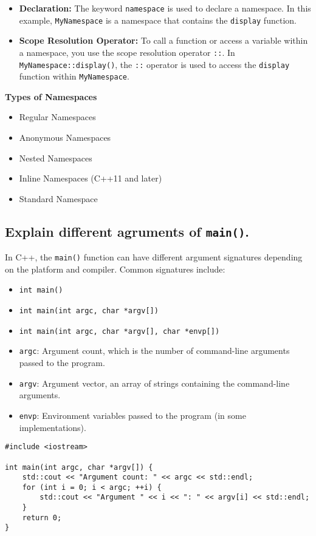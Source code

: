 \begin{itemize}
    \item \textbf{Declaration:} The keyword \texttt{namespace} is used to declare a namespace. In this example, \texttt{MyNamespace} is a namespace that contains the \texttt{display} function.
    \item \textbf{Scope Resolution Operator:} To call a function or access a variable within a namespace, you use the scope resolution operator \texttt{::}. In \texttt{MyNamespace::display()}, the \texttt{::} operator is used to access the \texttt{display} function within \texttt{MyNamespace}.
\end{itemize}

\textbf{Types of Namespaces}
\begin{itemize}
    \item Regular Namespaces
    \item Anonymous Namespaces
    \item Nested Namespaces
    \item Inline Namespaces (C++11 and later)
    \item Standard Namespace
\end{itemize}

\subsection{Explain different agruments of \texttt{main()}.}
In C++, the \texttt{main()} function can have different argument signatures depending on the platform and compiler. Common signatures include:
\begin{itemize}
    \item \texttt{int main()}
    \item \texttt{int main(int argc, char *argv[])}
    \item \texttt{int main(int argc, char *argv[], char *envp[])}
\end{itemize}
\begin{itemize}
    \item \texttt{argc}: Argument count, which is the number of command-line arguments passed to the program.
    \item \texttt{argv}: Argument vector, an array of strings containing the command-line arguments.
    \item \texttt{envp}: Environment variables passed to the program (in some implementations).
\end{itemize}
\begin{tcolorbox}[title=\texttt{main()} Function]
\begin{verbatim}
#include <iostream>

int main(int argc, char *argv[]) {
    std::cout << "Argument count: " << argc << std::endl;
    for (int i = 0; i < argc; ++i) {
        std::cout << "Argument " << i << ": " << argv[i] << std::endl;
    }
    return 0;
}
\end{verbatim}
\end{tcolorbox}

